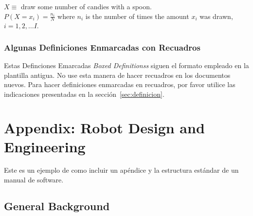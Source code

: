 \documentclass[11pt,letterpaper,twoside]{report}%
\begin{document}
\begin{example}
$X \equiv$ draw some number of candies with a spoon.\\[1ex]
$P(X=x_i) = \frac{n_i}{N}$ where $n_i$ is the number of times the amount $x_i$  was drawn, $i=1,2,\ldots I$.\\[1ex]
\end{example}

\subsection{Algunas Definiciones Enmarcadas con Recuadros}
Estas Definciones Emarcadas {\em Boxed Definitionss} siguen el formato empleado en la plantilla antigua.  No use esta manera de hacer recuadros en los documentos nuevos.  Para hacer definiciones enmarcadas en recuadros, por favor utilice las indicaciones presentadas en la sección~\ref{sec:definicion}.






\chapter*{\vspace*{-2\baselineskip}Appendix: Robot Design and Engineering}

Este es un ejemplo de como incluir un apéndice y la estructura estándar de un manual de software.
\section{General Background}
\end{document}
